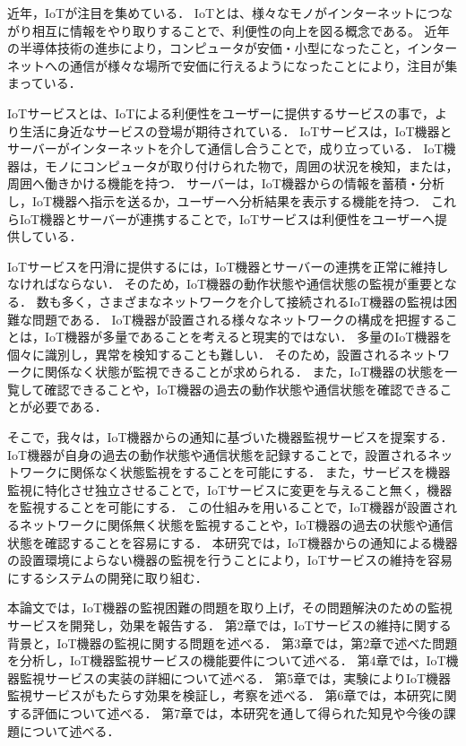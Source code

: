 
近年，IoTが注目を集めている．
IoTとは、様々なモノがインターネットにつながり相互に情報をやり取りすることで、利便性の向上を図る概念である。
近年の半導体技術の進歩により，コンピュータが安価・小型になったこと，インターネットへの通信が様々な場所で安価に行えるようになったことにより，注目が集まっている．
\medskip

IoTサービスとは、IoTによる利便性をユーザーに提供するサービスの事で，より生活に身近なサービスの登場が期待されている．
IoTサービスは，IoT機器とサーバーがインターネットを介して通信し合うことで，成り立っている．
IoT機器は，モノにコンピュータが取り付けられた物で，周囲の状況を検知，または，周囲へ働きかける機能を持つ．
サーバーは，IoT機器からの情報を蓄積・分析し，IoT機器へ指示を送るか，ユーザーへ分析結果を表示する機能を持つ．
これらIoT機器とサーバーが連携することで，IoTサービスは利便性をユーザーへ提供している．
\medskip

IoTサービスを円滑に提供するには，IoT機器とサーバーの連携を正常に維持しなければならない．
そのため，IoT機器の動作状態や通信状態の監視が重要となる．
数も多く，さまざまなネットワークを介して接続されるIoT機器の監視は困難な問題である．
IoT機器が設置される様々なネットワークの構成を把握することは，IoT機器が多量であることを考えると現実的ではない．
多量のIoT機器を個々に識別し，異常を検知することも難しい．
そのため，設置されるネットワークに関係なく状態が監視できることが求められる．
また，IoT機器の状態を一覧して確認できることや，IoT機器の過去の動作状態や通信状態を確認できることが必要である．
\medskip

そこで，我々は，IoT機器からの通知に基づいた機器監視サービスを提案する．
IoT機器が自身の過去の動作状態や通信状態を記録することで，設置されるネットワークに関係なく状態監視をすることを可能にする．
また，サービスを機器監視に特化させ独立させることで，IoTサービスに変更を与えること無く，機器を監視することを可能にする．
この仕組みを用いることで，IoT機器が設置されるネットワークに関係無く状態を監視することや，IoT機器の過去の状態や通信状態を確認することを容易にする．
本研究では，IoT機器からの通知による機器の設置環境によらない機器の監視を行うことにより，IoTサービスの維持を容易にするシステムの開発に取り組む．
\medskip

本論文では，IoT機器の監視困難の問題を取り上げ，その問題解決のための監視サービスを開発し，効果を報告する．
第2章では，IoTサービスの維持に関する背景と，IoT機器の監視に関する問題を述べる．
第3章では，第2章で述べた問題を分析し，IoT機器監視サービスの機能要件について述べる．
第4章では，IoT機器監視サービスの実装の詳細について述べる．
第5章では，実験によりIoT機器監視サービスがもたらす効果を検証し，考察を述べる．
第6章では，本研究に関する評価について述べる．
第7章では，本研究を通して得られた知見や今後の課題について述べる．





